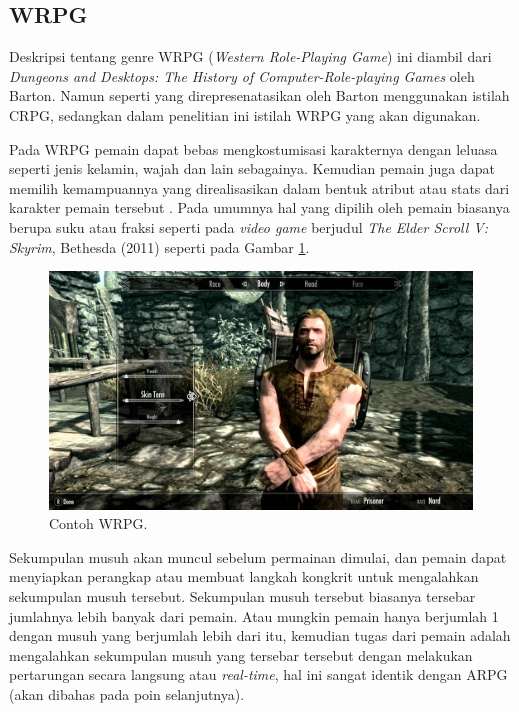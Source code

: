 \begin{subs}
	\subsection{WRPG}
	\label{sec:sub_sec2_wrpg}
	
	Deskripsi tentang genre WRPG (\textit{Western Role-Playing Game}) ini diambil dari \textit{Dungeons and Desktops: The History of Computer-Role-playing Games} oleh Barton. Namun seperti yang direpresenatasikan oleh Barton menggunakan istilah CRPG, sedangkan dalam penelitian ini istilah WRPG yang akan digunakan.
	\vspace{1ex}
	
	Pada WRPG pemain dapat bebas mengkostumisasi karakternya dengan leluasa seperti jenis kelamin, wajah dan lain sebagainya. Kemudian pemain juga dapat memilih kemampuannya yang direalisasikan dalam bentuk atribut atau stats dari karakter pemain tersebut \citep{barton2019}. Pada umumnya hal yang dipilih oleh pemain biasanya berupa suku atau fraksi seperti pada \textit{video game} berjudul \textit{The Elder Scroll V: Skyrim}, Bethesda (2011) seperti pada Gambar \ref{fig:skyrim}.
	\vspace{1ex}
	
	\begin{figure} [!h] \centering
		\includegraphics[scale=0.18]{img/skyrim.jpg}
		\caption{Contoh WRPG.}
		\label{fig:skyrim}
	\end{figure}

	Sekumpulan musuh akan muncul sebelum permainan dimulai, dan pemain dapat menyiapkan perangkap atau membuat langkah kongkrit untuk mengalahkan sekumpulan  musuh tersebut. Sekumpulan musuh tersebut biasanya tersebar jumlahnya lebih banyak dari pemain. Atau mungkin pemain hanya berjumlah 1 dengan musuh yang berjumlah lebih dari itu, kemudian tugas dari pemain adalah mengalahkan sekumpulan musuh yang tersebar tersebut dengan melakukan pertarungan secara langsung atau \textit{real-time}, hal ini sangat identik dengan ARPG (akan dibahas pada poin selanjutnya).
	\vspace{1ex}
	

\end{subs}
